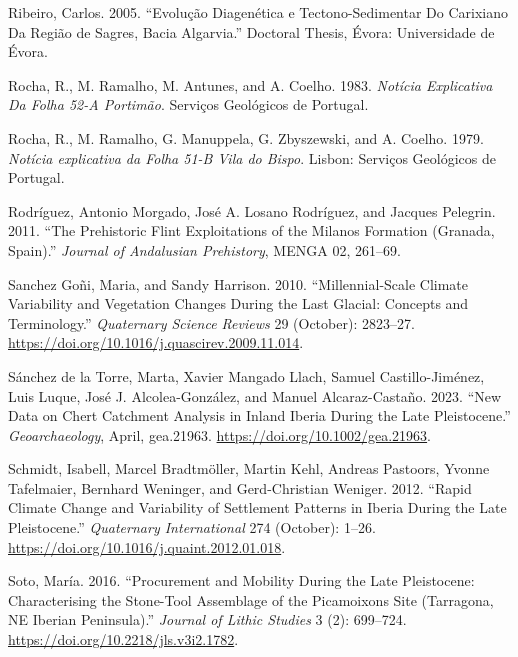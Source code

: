 \documentclass[
  a4paper,
  DIV=11,
  numbers=noendperiod]{scrreprt}
\newlength{\cslhangindent}
\newenvironment{CSLReferences}[2] %
 {\begin{list}{}{%
  \setlength{\itemindent}{0pt}
  \setlength{\leftmargin}{0pt}
  \setlength{\parsep}{0pt}
  \ifodd #1
   \setlength{\leftmargin}{\cslhangindent}
   \setlength{\itemindent}{-1\cslhangindent}
  \fi
  \setlength{\itemsep}{#2\baselineskip}}}
 {\end{list}}
\begin{document}
\begin{CSLReferences}{1}{0}
Ribeiro, Carlos. 2005. {``Evolu{ç}{ã}o {Diagen{é}tica} e
{Tectono-Sedimentar} Do {Carixiano} Da {Regi{ã}o} de {Sagres}, {Bacia
Algarvia}.''} Doctoral Thesis, {É}vora: Universidade de {É}vora.

Rocha, R., M. Ramalho, M. Antunes, and A. Coelho. 1983. \emph{Not{í}cia
Explicativa Da {Folha} 52-{A Portim{ã}o}}. Servi{ç}os Geol{ó}gicos de
Portugal.

Rocha, R., M. Ramalho, G. Manuppela, G. Zbyszewski, and A. Coelho. 1979.
\emph{{Not{í}cia explicativa da Folha 51-B Vila do Bispo}}. Lisbon:
Servi{ç}os Geol{ó}gicos de Portugal.

Rodríguez, Antonio Morgado, José A. Losano Rodríguez, and Jacques
Pelegrin. 2011. {``{The Prehistoric Flint Exploitations of the Milanos
Formation (Granada, Spain)}.''} \emph{Journal of Andalusian Prehistory},
{MENGA 02}, 261--69.

Sanchez Goñi, Maria, and Sandy Harrison. 2010. {``Millennial-Scale
Climate Variability and Vegetation Changes During the {Last Glacial}:
{Concepts} and Terminology.''} \emph{Quaternary Science Reviews} 29
(October): 2823--27.
\url{https://doi.org/10.1016/j.quascirev.2009.11.014}.

Sánchez de la Torre, Marta, Xavier Mangado Llach, Samuel
Castillo-Jiménez, Luis Luque, José J. Alcolea-González, and Manuel
Alcaraz-Castaño. 2023. {``New Data on Chert Catchment Analysis in Inland
{Iberia} During the {Late Pleistocene}.''} \emph{Geoarchaeology}, April,
gea.21963. \url{https://doi.org/10.1002/gea.21963}.

Schmidt, Isabell, Marcel Bradtmöller, Martin Kehl, Andreas Pastoors,
Yvonne Tafelmaier, Bernhard Weninger, and Gerd-Christian Weniger. 2012.
{``Rapid Climate Change and Variability of Settlement Patterns in
{Iberia} During the {Late Pleistocene}.''} \emph{Quaternary
International} 274 (October): 1--26.
\url{https://doi.org/10.1016/j.quaint.2012.01.018}.

Soto, María. 2016. {``Procurement and Mobility During the {Late
Pleistocene}: {Characterising} the Stone-Tool Assemblage of the
{Picamoixons} Site ({Tarragona}, {NE Iberian Peninsula}).''}
\emph{Journal of Lithic Studies} 3 (2): 699--724.
\url{https://doi.org/10.2218/jls.v3i2.1782}.


\end{CSLReferences}
\end{document}
